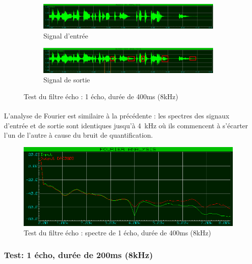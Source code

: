 \documentclass{article}
\begin{document}
    \begin{figure}[H]
        \centering
        \begin{subfigure}[b]{\textwidth}
            \centering
            \includegraphics[width=\textwidth]{./images/in_echo_8k.png}
            \caption{Signal d'entrée}
        \end{subfigure}
        \begin{subfigure}[b]{\textwidth}
            \centering
            \includegraphics[width=\textwidth]{./images/out_echo_1_400ms_8k.png}
            \caption{Signal de sortie}
            \label{fig:echo_8k_out}
        \end{subfigure}
        \caption{Test du filtre écho : 1 écho, durée de 400ms (8kHz)}
    \end{figure}

    \paragraph{}
    L'analyse de Fourier est similaire à la précédente : les spectres des signaux d'entrée et de sortie sont identiques jusqu'à \SI{4}{\kilo\hertz} où ils commencent à s'écarter l'un de l'autre à cause du bruit de quantification.

    \begin{figure}[H]
        \centering
        \includegraphics[width=.6\textwidth]{./images/spectrum_echo_1_400ms_8k.png}
        \caption{Test du filtre écho : spectre de 1 écho, durée de 400ms (8kHz)}
    \end{figure}

    \subsubsection{Test: 1 écho, durée de 200ms (8kHz)}
\end{document}
